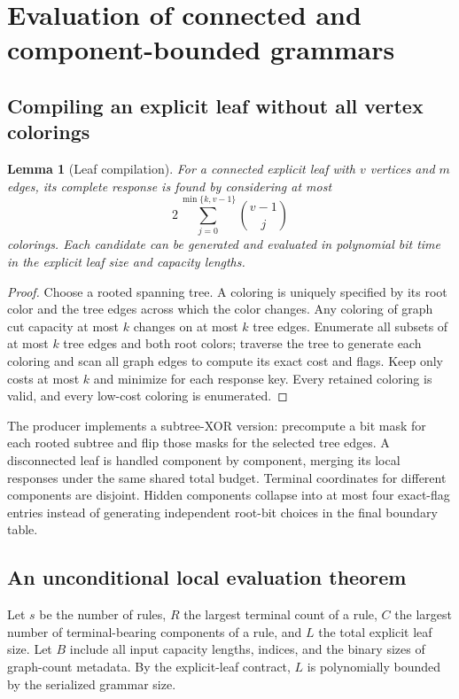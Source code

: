 \documentclass[11pt,a4paper]{article}
\newtheorem{lemma}[theorem]{Lemma}
\theoremstyle{definition}
\theoremstyle{remark}
\begin{document}
\section{Evaluation of connected and component-bounded grammars}
\label{sec:evaluator}
\subsection{Compiling an explicit leaf without all vertex colorings}
\begin{lemma}[Leaf compilation]
\label{lem:leaf}
For a connected explicit leaf with $v$ vertices and $m$ edges, its complete response is found by considering at most
\[
 2\sum_{j=0}^{\min\{k,v-1\}}\binom{v-1}{j}
\]
colorings. Each candidate can be generated and evaluated in polynomial bit time in the explicit leaf size and capacity lengths.
\end{lemma}
\begin{proof}
Choose a rooted spanning tree. A coloring is uniquely specified by its root color and the tree edges across which the color changes. Any coloring of graph cut capacity at most $k$ changes on at most $k$ tree edges. Enumerate all subsets of at most $k$ tree edges and both root colors; traverse the tree to generate each coloring and scan all graph edges to compute its exact cost and flags. Keep only costs at most $k$ and minimize for each response key. Every retained coloring is valid, and every low-cost coloring is enumerated.
\end{proof}
The producer implements a subtree-XOR version: precompute a bit mask for each rooted subtree and flip those masks for the selected tree edges. A disconnected leaf is handled component by component, merging its local responses under the same shared total budget. Terminal coordinates for different components are disjoint. Hidden components collapse into at most four exact-flag entries instead of generating independent root-bit choices in the final boundary table.

\subsection{An unconditional local evaluation theorem}
Let $s$ be the number of rules, $R$ the largest terminal count of a rule, $C$ the largest number of terminal-bearing components of a rule, and $L$ the total explicit leaf size. Let $B$ include all input capacity lengths, indices, and the binary sizes of graph-count metadata. By the explicit-leaf contract, $L$ is polynomially bounded by the serialized grammar size.
\end{document}
